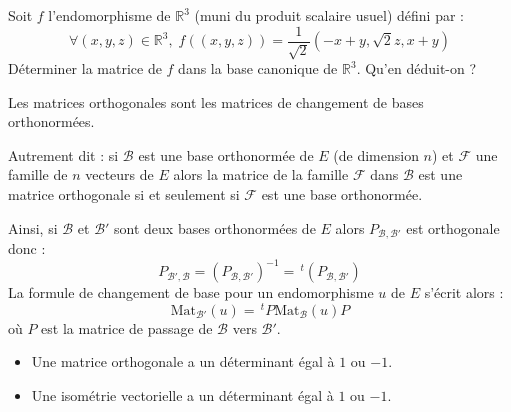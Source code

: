 \documentclass[french,11pt,twoside]{VcCours}
\begin{document}
\vspace{5cm}

\begin{Exemple}{} Soit $f$ l'endomorphisme de $\mathbb{R}^3$ (muni du produit scalaire usuel) défini par :
$$ \forall (x,y,z) \in \mathbb{R}^3, \; f((x,y,z)) = \dfrac{1}{\sqrt{2}} (-x+y , \sqrt{2}z, x+y)$$
Déterminer la matrice de $f$ dans la base canonique de $\mathbb{R}^3$. Qu'en déduit-on ?


\vspace{5cm}

\end{Exemple}

\begin{Proposition}{} Les matrices orthogonales sont les matrices de changement de bases orthonormées. 

Autrement dit : si $\mathcal{B}$ est une base orthonormée de $E$ (de dimension $n$) et $\mathcal{F}$ une famille de $n$ vecteurs de $E$ alors la matrice de la famille $\mathcal{F}$ dans $\mathcal{B}$ est une matrice orthogonale si et seulement si $\mathcal{F}$ est une base orthonormée.
\end{Proposition}

\begin{Demonstration}{}
\vspace{3cm}
\end{Demonstration}

\begin{Remarque}{} Ainsi, si $\mathcal{B}$ et $\mathcal{B}'$ sont deux bases orthonormées de $E$ alors $P_{\mathcal{B}, \mathcal{B}'}$ est orthogonale donc :
$$P_{\mathcal{B}', \mathcal{B}} = (P_{\mathcal{B}, \mathcal{B}'})^{-1} = \, ^t(P_{\mathcal{B}, \mathcal{B}'})$$
La formule de changement de base pour un endomorphisme $u$ de $E$ s'écrit alors :
$$ \textrm{Mat}_{\mathcal{B'}}(u) = \,  ^tP \textrm{Mat}_{\mathcal{B}}(u) P$$
où $P$ est la matrice de passage de $\mathcal{B}$ vers $\mathcal{B}'$.
\end{Remarque}

\begin{Proposition}{} 
\begin{itemize}
\item Une matrice orthogonale a un déterminant égal à $1$ ou $-1$.
\item Une isométrie vectorielle a un déterminant égal à $1$ ou $-1$.
\end{itemize}
\end{Proposition}

\begin{Demonstration}{}
\vspace{4cm}
\end{Demonstration}
\end{document}
